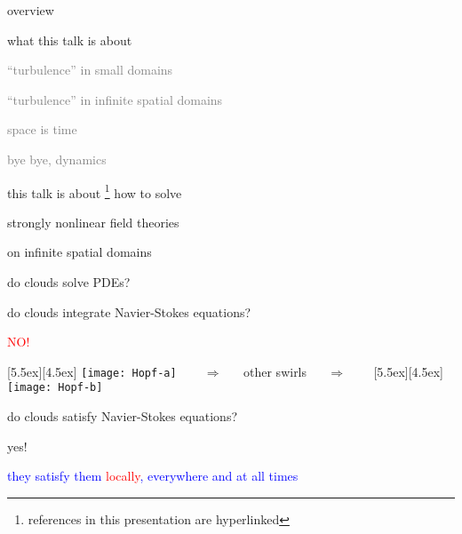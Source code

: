 \begin{frame}{overview}
\begin{enumerate}
              \item {\Large
what this talk is about
                  }\textcolor{gray}{\small
              \item
``turbulence'' in small domains
              \item
``turbulence'' in infinite spatial domains
              \item
space is time
              \item
bye bye, dynamics
                    }
            \end{enumerate}
\end{frame}

\begin{frame}{this talk is about
\footnote{references in this presentation are hyperlinked}
}
how to solve

\vfill

{\Large
strongly nonlinear field theories
                  }
\vfill

on infinite spatial domains
\end{frame}


\begin{frame}{do clouds solve PDEs?}

do clouds integrate Navier-Stokes equations?

\begin{center}
\centerline{\textcolor{red}{\Huge NO!}}

\begin{minipage}[t]{\textwidth}
	\begin{center}
\centerline{
\raisebox{-4.0ex}[5.5ex][4.5ex]
		 {\texttt{[image: Hopf-a]}}
~~~ $\Longrightarrow$ ~~ {other swirls} ~~ $\Longrightarrow$ ~~~
	\raisebox{-4.0ex}[5.5ex][4.5ex]
		 {\texttt{[image: Hopf-b]}}
          }
	\end{center}
\end{minipage}
\end{center}

do clouds satisfy Navier-Stokes equations?

\bigskip

{\Large yes!}

\centerline{
\textcolor{blue}{they satisfy them \textcolor{red}{\large locally}, everywhere and at all times}
}
\end{frame}

